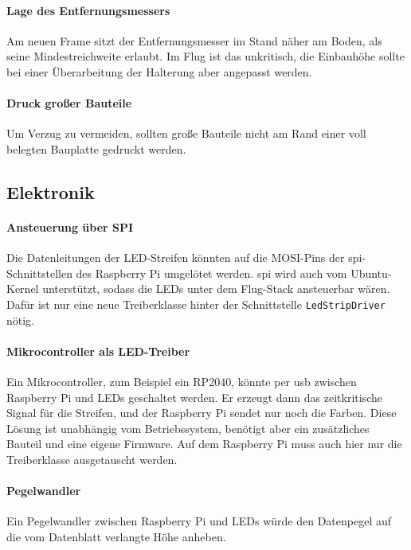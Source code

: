     \paragraph{Lage des Entfernungsmessers}
    Am neuen Frame sitzt der Entfernungsmesser im Stand näher am Boden, als seine Mindestreichweite erlaubt.
    Im Flug ist das unkritisch, die Einbauhöhe sollte bei einer Überarbeitung der Halterung aber angepasst werden.

    \paragraph{Druck großer Bauteile}
    Um Verzug zu vermeiden, sollten große Bauteile nicht am Rand einer voll belegten Bauplatte gedruckt werden.

    \subsection{Elektronik}
    \label{sec:Ausblick_Elektronik}

    \paragraph{Ansteuerung über SPI}
    Die Datenleitungen der LED-Streifen könnten auf die MOSI-Pins der \gls{spi}-Schnittstellen des Raspberry Pi
    umgelötet werden.
    \gls{spi} wird auch vom Ubuntu-Kernel unterstützt, sodass die LEDs unter dem Flug-Stack ansteuerbar wären.
    Dafür ist nur eine neue Treiberklasse hinter der Schnittstelle \texttt{LedStripDriver} nötig.

    \paragraph{Mikrocontroller als LED-Treiber}
    Ein Mikrocontroller, zum Beispiel ein RP2040, könnte per \gls{usb} zwischen Raspberry Pi und LEDs geschaltet werden.
    Er erzeugt dann das zeitkritische Signal für die Streifen, und der Raspberry Pi sendet nur noch die Farben.
    Diese Lösung ist unabhängig vom Betriebssystem, benötigt aber ein zusätzliches Bauteil und eine eigene Firmware.
    Auf dem Raspberry Pi muss auch hier nur die Treiberklasse ausgetauscht werden.

    \paragraph{Pegelwandler}
    Ein Pegelwandler zwischen Raspberry Pi und LEDs würde den Datenpegel auf die vom Datenblatt verlangte Höhe anheben.

